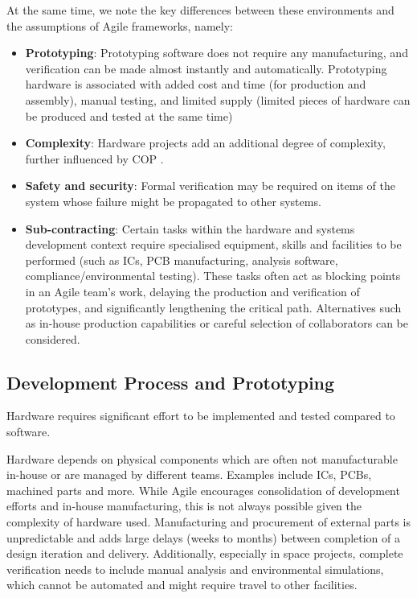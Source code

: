 \documentclass[journal,10pt]{IEEEtran}
\begin{document}
At the same time, we note the key differences between these environments and the assumptions of Agile frameworks, namely:
\begin{itemize}
	\item \textbf{Prototyping}:
	Prototyping software does not require any manufacturing, and verification can be made almost instantly and automatically.
	Prototyping hardware is associated with added cost and time (for production and assembly), manual testing, and limited supply (limited pieces of hardware can be produced and tested at the same time)
	\item \textbf{Complexity}: %
	Hardware projects add an additional degree of complexity, further influenced by \acf{COP} \autocite{schmidtAgileDevelopmentConstraints2017}.
	\item \textbf{Safety and security}: Formal verification may be required on items of the system whose failure might be propagated to other systems.
	\item \textbf{Sub-contracting}: Certain tasks within the hardware and systems development context require specialised equipment, skills and facilities to be performed (such as \acsp{IC}, \acs{PCB} manufacturing, analysis software, compliance/environmental testing). These tasks often act as blocking points in an Agile team's work, delaying the production and verification of prototypes, and significantly lengthening the critical path.
	Alternatives such as in-house production capabilities or careful selection of collaborators can be considered.
\end{itemize}


\subsection{Development Process and Prototyping}
\label{sec:process}

Hardware requires significant effort to be implemented and tested compared to software.

Hardware depends on physical components which are often not manufacturable in-house or are managed by different teams. Examples include \acp{IC}, \acp{PCB}, machined parts and more. While Agile encourages consolidation of development efforts and in-house manufacturing, this is not always possible given the complexity of hardware used. %
Manufacturing and procurement of external parts is unpredictable and adds large delays (weeks to months) between completion of a design iteration and delivery.
Additionally, especially in space projects, complete verification needs to include manual analysis and environmental simulations, which cannot be automated and might require travel to other facilities.
\end{document}
